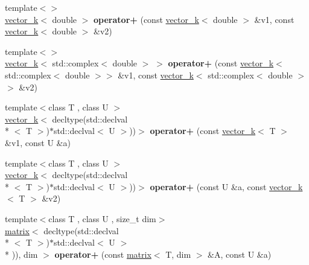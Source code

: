 \begin{DoxyCompactItemize}
\item 
\hypertarget{namespacekeycpp_ae416b3cc307c30afdb62f0ed37b70e05}{{\footnotesize template$<$$>$ }\\\hyperlink{classkeycpp_1_1vector__k}{vector\-\_\-k}$<$ double $>$ {\bfseries operator+} (const \hyperlink{classkeycpp_1_1vector__k}{vector\-\_\-k}$<$ double $>$ \&v1, const \hyperlink{classkeycpp_1_1vector__k}{vector\-\_\-k}$<$ double $>$ \&v2)}\label{namespacekeycpp_ae416b3cc307c30afdb62f0ed37b70e05}

\item 
\hypertarget{namespacekeycpp_ade9508aa24d2496bd63dcdb72229c8b0}{{\footnotesize template$<$$>$ }\\\hyperlink{classkeycpp_1_1vector__k}{vector\-\_\-k}$<$ std\-::complex$<$ double $>$ $>$ {\bfseries operator+} (const \hyperlink{classkeycpp_1_1vector__k}{vector\-\_\-k}$<$ std\-::complex$<$ double $>$$>$ \&v1, const \hyperlink{classkeycpp_1_1vector__k}{vector\-\_\-k}$<$ std\-::complex$<$ double $>$$>$ \&v2)}\label{namespacekeycpp_ade9508aa24d2496bd63dcdb72229c8b0}

\item 
\hypertarget{namespacekeycpp_a68fe0fe851bce021be6a0609da7df82d}{{\footnotesize template$<$class T , class U $>$ }\\\hyperlink{classkeycpp_1_1vector__k}{vector\-\_\-k}$<$ decltype(std\-::declval\\*
$<$ T $>$)$\ast$std\-::declval$<$ U $>$))$>$ {\bfseries operator+} (const \hyperlink{classkeycpp_1_1vector__k}{vector\-\_\-k}$<$ T $>$ \&v1, const U \&a)}\label{namespacekeycpp_a68fe0fe851bce021be6a0609da7df82d}

\item 
\hypertarget{namespacekeycpp_af28312b8c309091f03e373e1ae5f3d46}{{\footnotesize template$<$class T , class U $>$ }\\\hyperlink{classkeycpp_1_1vector__k}{vector\-\_\-k}$<$ decltype(std\-::declval\\*
$<$ T $>$)$\ast$std\-::declval$<$ U $>$))$>$ {\bfseries operator+} (const U \&a, const \hyperlink{classkeycpp_1_1vector__k}{vector\-\_\-k}$<$ T $>$ \&v2)}\label{namespacekeycpp_af28312b8c309091f03e373e1ae5f3d46}

\item 
\hypertarget{namespacekeycpp_adb8866924fddc4057262b0ab42615437}{{\footnotesize template$<$class T , class U , size\-\_\-t dim$>$ }\\\hyperlink{classkeycpp_1_1matrix}{matrix}$<$ decltype(std\-::declval\\*
$<$ T $>$)$\ast$std\-::declval$<$ U $>$\\*
)), dim $>$ {\bfseries operator+} (const \hyperlink{classkeycpp_1_1matrix}{matrix}$<$ T, dim $>$ \&A, const U \&a)}\label{namespacekeycpp_adb8866924fddc4057262b0ab42615437}


\end{DoxyCompactItemize}

